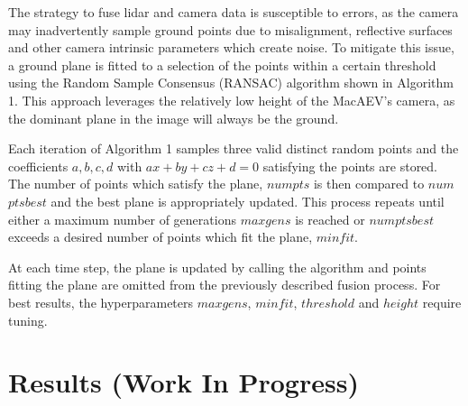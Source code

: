 \documentclass[conference]{IEEEtran}
\begin{document}
The strategy to fuse lidar and camera data is susceptible to errors, as the camera may inadvertently sample ground points due to misalignment, reflective surfaces and other camera intrinsic parameters which create noise. To mitigate this issue, a ground plane is fitted to a selection of the points within a certain threshold using the Random Sample Consensus (RANSAC) algorithm shown in Algorithm 1. This approach leverages the relatively low height of the MacAEV's camera, as the dominant plane in the image will always be the ground. 


Each iteration of Algorithm 1 samples three valid distinct random points and the coefficients $a,b,c,d$ with $ax + by + cz + d = 0$ satisfying the points are stored. The number of points which satisfy the plane, $num$\textunderscore $pts$ is then compared to $num$\textunderscore $pts$\textunderscore $best$ and the best plane is appropriately updated. This process repeats until either a maximum number of generations $max$\textunderscore $gens$ is reached or $num$\textunderscore $pts$\textunderscore $best$ exceeds a desired number of points which fit the plane, $min$\textunderscore $fit$. 

At each time step, the plane is updated by calling the algorithm and points fitting the plane are omitted from the previously described fusion process. For best results, the hyperparameters $max$\textunderscore $gens$, $min$\textunderscore $fit$, $threshold$ and $height$ require tuning. 








\section{Results (Work In Progress)}
\end{document}
